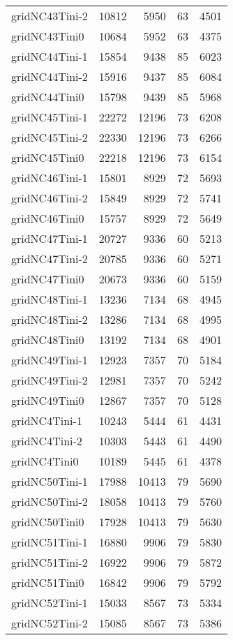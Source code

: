\documentclass[../../../thesis.tex]{subfiles}
\begin{document}
\begin{longtable}{lrrrr}
gridNC43Tini-2 & 10812 & 5950 & 63 & 4501 \\
gridNC43Tini0 & 10684 & 5952 & 63 & 4375 \\
gridNC44Tini-1 & 15854 & 9438 & 85 & 6023 \\
gridNC44Tini-2 & 15916 & 9437 & 85 & 6084 \\
gridNC44Tini0 & 15798 & 9439 & 85 & 5968 \\
gridNC45Tini-1 & 22272 & 12196 & 73 & 6208 \\
gridNC45Tini-2 & 22330 & 12196 & 73 & 6266 \\
gridNC45Tini0 & 22218 & 12196 & 73 & 6154 \\
gridNC46Tini-1 & 15801 & 8929 & 72 & 5693 \\
gridNC46Tini-2 & 15849 & 8929 & 72 & 5741 \\
gridNC46Tini0 & 15757 & 8929 & 72 & 5649 \\
gridNC47Tini-1 & 20727 & 9336 & 60 & 5213 \\
gridNC47Tini-2 & 20785 & 9336 & 60 & 5271 \\
gridNC47Tini0 & 20673 & 9336 & 60 & 5159 \\
gridNC48Tini-1 & 13236 & 7134 & 68 & 4945 \\
gridNC48Tini-2 & 13286 & 7134 & 68 & 4995 \\
gridNC48Tini0 & 13192 & 7134 & 68 & 4901 \\
gridNC49Tini-1 & 12923 & 7357 & 70 & 5184 \\
gridNC49Tini-2 & 12981 & 7357 & 70 & 5242 \\
gridNC49Tini0 & 12867 & 7357 & 70 & 5128 \\
gridNC4Tini-1 & 10243 & 5444 & 61 & 4431 \\
gridNC4Tini-2 & 10303 & 5443 & 61 & 4490 \\
gridNC4Tini0 & 10189 & 5445 & 61 & 4378 \\
gridNC50Tini-1 & 17988 & 10413 & 79 & 5690 \\
gridNC50Tini-2 & 18058 & 10413 & 79 & 5760 \\
gridNC50Tini0 & 17928 & 10413 & 79 & 5630 \\
gridNC51Tini-1 & 16880 & 9906 & 79 & 5830 \\
gridNC51Tini-2 & 16922 & 9906 & 79 & 5872 \\
gridNC51Tini0 & 16842 & 9906 & 79 & 5792 \\
gridNC52Tini-1 & 15033 & 8567 & 73 & 5334 \\
gridNC52Tini-2 & 15085 & 8567 & 73 & 5386 \\

\end{longtable}
\end{document}
